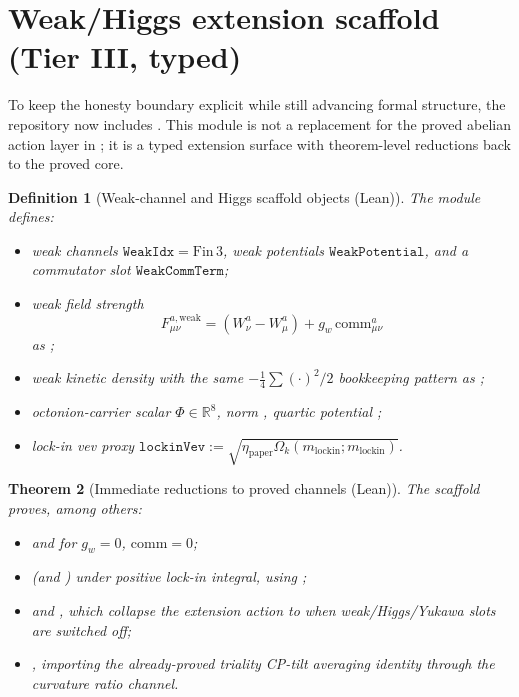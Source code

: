 \documentclass[11pt]{amsart}
\newtheorem{theorem}{Theorem}[section]
\newtheorem{definition}[theorem]{Definition}
\begin{document}
\section{Weak/Higgs extension scaffold (Tier III, typed)}
\label{sec:weak-higgs-scaffold}

To keep the honesty boundary explicit while still advancing formal structure, the repository now includes
. This module is not a replacement for the proved
abelian action layer in ; it is a typed extension surface with theorem-level reductions
back to the proved core.

\begin{definition}[Weak-channel and Higgs scaffold objects (Lean)]
The module defines:
\begin{itemize}
\item weak channels \(\texttt{WeakIdx}=\mathrm{Fin}\,3\), weak potentials \(\texttt{WeakPotential}\), and a commutator slot \(\texttt{WeakCommTerm}\);
\item weak field strength
\[
F^{a,\mathrm{weak}}_{\mu\nu}=(W^a_\nu-W^a_\mu)+g_w\,\mathrm{comm}^a_{\mu\nu}
\]
as ;
\item weak kinetic density  with the same \(-\tfrac14\sum(\cdot)^2/2\) bookkeeping pattern as ;
\item octonion-carrier scalar \(\Phi\in\mathbb{R}^8\), norm , quartic potential ;
\item lock-in vev proxy \(\texttt{lockinVev}:=\sqrt{\eta_{\mathrm{paper}}\Omega_k(m_{\mathrm{lockin}};m_{\mathrm{lockin}})}\).
\end{itemize}
\end{definition}

\begin{theorem}[Immediate reductions to proved channels (Lean)]
\label{thm:weak-higgs-reductions}
The scaffold proves, among others:
\begin{itemize}
\item {} and  for \(g_w=0\), \(\mathrm{comm}=0\);
\item {} (and ) under positive lock-in integral, using ;
\item {} and
, which collapse the extension action to
 when weak/Higgs/Yukawa slots are switched off;
\item {}, importing the already-proved triality CP-tilt averaging identity through the curvature ratio channel.
\end{itemize}
\end{theorem}
\end{document}
